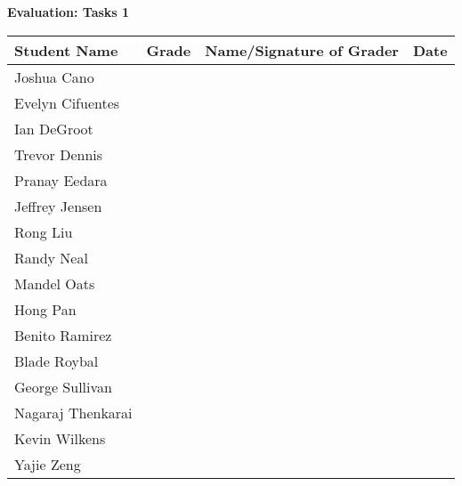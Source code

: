 \documentclass[11pt]{article}
\begin{document}
\begin{center}
{\bfseries \LARGE Evaluation: Tasks 1}
\end{center}

\begin{center}
\begin{tabular}{|p{1.75in}|p{0.75in}|p{2.5in}|p{0.75in}|}
\hline
\textbf{Student Name} & \textbf{Grade} & Name/Signature of Grader & Date \\
\hline
Joshua Cano & & & \\ \hline
Evelyn Cifuentes & & & \\ \hline
Ian DeGroot & & & \\ \hline
Trevor Dennis & & & \\ \hline
Pranay Eedara & & & \\ \hline
Jeffrey Jensen & & & \\ \hline
Rong Liu & & & \\ \hline
Randy Neal & & & \\ \hline
Mandel Oats & & & \\ \hline
Hong Pan & & & \\ \hline
Benito Ramirez & & & \\ \hline
Blade Roybal & & & \\ \hline
George Sullivan & & & \\ \hline
Nagaraj Thenkarai & & & \\ \hline
Kevin Wilkens & & & \\ \hline
Yajie Zeng & & & \\ \hline
\end{tabular}
\end{center}
\end{document}
